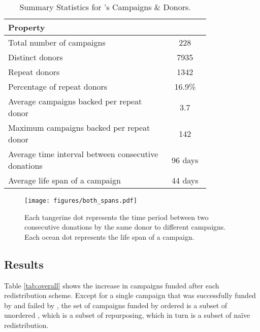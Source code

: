 \begin{table}[htpb]
    {\cf \small
    \centering
    \begin{tabular}{p{0.79\linewidth}c}
        \toprule
        \textbf{Property} &  \\
        \midrule
        Total number of campaigns & 228 \\
        Distinct donors & 7935 \\
        Repeat donors & 1342 \\
        Percentage of repeat donors &  16.9\% \\
        Average campaigns backed per repeat donor & 3.7  \\
        Maximum campaigns backed per repeat donor & 142 \\
        Average time interval between consecutive donations & 96 days \\
        Average life span of a campaign & 44 days \\
         \bottomrule
    \end{tabular}
    }
    \caption{Summary Statistics for \lag's Campaigns \& Donors.}
    \label{tab:donorstats}
\end{table}



\begin{figure*}
    \centering
    \texttt{[image: figures/both\_spans.pdf]}
    \caption{Each {\color{tangerine} tangerine} dot represents the time period between two consecutive donations by the same donor to different campaigns. Each {\color{ocean} ocean} dot represents the life span of a campaign.}
    \label{fig:span}
\end{figure*}





\subsection{Results}
\label{sec:results}

Table \ref{tab:overall} shows the increase in campaigns funded after each redistribution scheme. Except for a single campaign that was successfully funded by \cpr and failed by \car, the set of campaigns funded by ordered \cpr is a subset of unordered \cpr, which is a subset of repurposing, which in turn is a subset of na\"ive redistribution.



